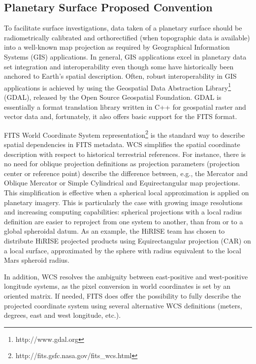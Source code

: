 \subsection{Planetary Surface Proposed Convention}
\label{ssec:geofits}
To facilitate surface investigations, data taken of a planetary surface should be
radiometrically calibrated and orthorectified (when topographic data is available)
into a well-known map projection as required by Geographical Information Systems (GIS)
applications.
In general, GIS applications excel in planetary data set integration and 
interoperability even though some have historically been anchored to Earth's spatial
description.
Often, robust interoperability in GIS applications is achieved by using the Geospatial
Data Abstraction Library\footnote{http://www.gdal.org} (GDAL), released by the Open
Source Geospatial Foundation.
GDAL is essentially a format translation library written in C++ for geospatial raster
and vector data and, fortunately, it also offers basic support for the FITS format.

FITS World Coordinate System
representation\footnote{http://fits.gsfc.nasa.gov/fits\_wcs.html} is the standard
way to describe spatial dependencies in FITS metadata.
WCS simplifies the spatial coordinate description with respect to historical
terrestrial references.
For instance, there is no need for oblique projection definitions
\citep{calagreisenI,Snyder1987} as projection parameters
(projection center or reference point)
describe the difference between, e.g., the Mercator and
Oblique Mercator or Simple Cylindrical and
Equirectangular map projections.
This simplification is effective when a spherical local approximation
is applied on planetary imagery.
This is particularly the case with growing image resolutions and
increasing computing capabilities: spherical projections with a local
radius definition are easier to reproject from one system to another, than
from or to a global spheroidal datum.
As an example, the HiRISE team has chosen to distribute HiRISE projected
products using Equirectangular projection (CAR) on a local surface, approximated
by the sphere with radius equivalent to the local Mars spheroid radius.

In addition, WCS resolves the ambiguity between east-positive and west-positive
longitude systems, as the pixel conversion in world coordinates is set by an
oriented matrix.
If needed, FITS does offer the possibility to fully describe the projected
coordinate system using several alternative WCS definitions (meters, degrees,
east and west longitude, etc.)\citep{greisencalaII}.

